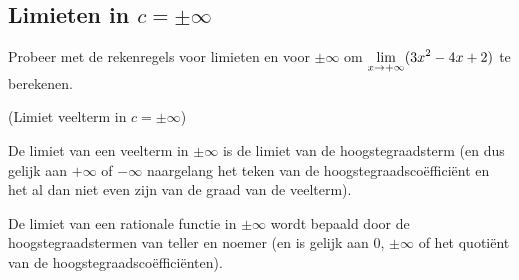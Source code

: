 \documentclass[numbers]{ximera}
\begin{document}
\subsection{Limieten in $c=\pm\infty$ }


\begin{exercise}
Probeer met de rekenregels voor limieten en voor $\pm\infty$ om $\limxi (3x^2-4x+2)$ te berekenen.


\end{exercise}

\begin{proposition} (Limiet veelterm in $c=\pm\infty$)

De limiet van een veelterm in $\pm\infty$ is de limiet van de hoogstegraadsterm (en dus gelijk aan $+\infty$ of $-\infty$ naargelang het teken van de hoogstegraadscoëfficiënt en het al dan niet even zijn van de graad van de veelterm).

De limiet van een rationale functie in $\pm\infty$ wordt bepaald door de hoogstegraadstermen van teller en noemer (en is gelijk aan $0$, $\pm\infty$ of het quotiënt van de hoogstegraadscoëfficiënten).
\end{proposition}
\end{document}
